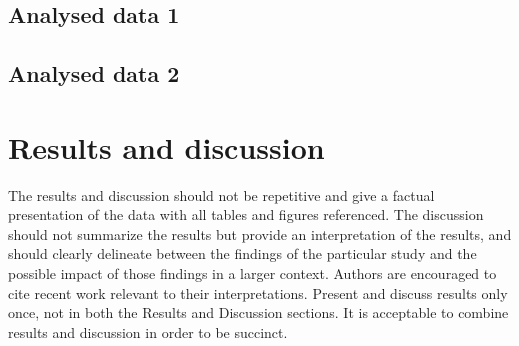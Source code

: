 \documentclass[9pt,twocolumn,twoside,lineno]{gsag3jnl}
\begin{document}


\subsection{Analysed data 1}

\subsection{Analysed data 2}

\section{Results and discussion}

The results and discussion should not be repetitive and give a factual presentation of the data with all tables and figures referenced. The discussion should not summarize the results but provide an interpretation of the results, and should clearly delineate between the findings of the particular study and the possible impact of those findings in a larger context. Authors are encouraged to cite recent work relevant to their interpretations. Present and discuss results only once, not in both the Results and Discussion sections. It is acceptable to combine results and discussion in order to be succinct.
\end{document}
